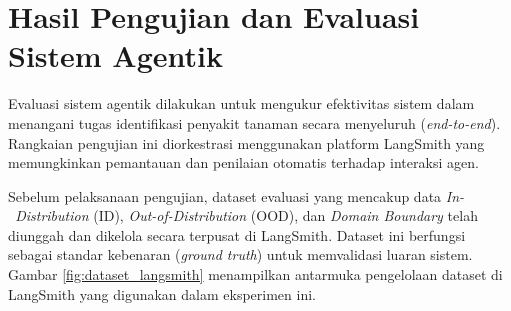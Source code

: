 \begin{table}[H]
    \centering
    \caption{Pengujian \textit{Black Box} Antarmuka Sistem Agentik}
    \label{tab:black_box_testing}
    \small
\end{table}

\section{Hasil Pengujian dan Evaluasi Sistem Agentik}
Evaluasi sistem agentik dilakukan untuk mengukur efektivitas sistem dalam menangani tugas identifikasi penyakit tanaman secara menyeluruh (\textit{end-to-end}). Rangkaian pengujian ini diorkestrasi menggunakan platform LangSmith yang memungkinkan pemantauan dan penilaian otomatis terhadap interaksi agen.

Sebelum pelaksanaan pengujian, dataset evaluasi yang mencakup data \textit{In-\ \allowbreak Distribution} (ID), \textit{Out-of-Distribution} (OOD), dan \textit{Domain Boundary} telah diunggah dan dikelola secara terpusat di LangSmith. Dataset ini berfungsi sebagai standar kebenaran (\textit{ground truth}) untuk memvalidasi luaran sistem. Gambar \ref{fig:dataset_langsmith} menampilkan antarmuka pengelolaan dataset di LangSmith yang digunakan dalam eksperimen ini.

